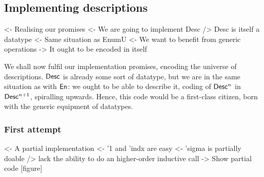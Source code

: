 \subsection{Implementing descriptions}

\begin{wstructure}
<- Realising our promises
    <- We are going to implement Desc
    /> Desc is itself a datatype
        <- Same situation as EnumU
            <- We want to benefit from generic operations
        -> It ought to be encoded in itself
\end{wstructure}

We shall now fulfil our implementation promises, encoding the universe
of descriptions. $\Desc$ is already some sort of datatype, but we are
in the same situation as with $\EnumU$: we ought to be able to
describe it, coding of $\Desc^n$ in $\Desc^{n+1}$, spiralling
upwards. Hence, this code would be a first-class citizen, born with
the generic equipment of datatypes.

\subsubsection{First attempt}

\begin{wstructure}
<- A partial implementation
    <- '1 and 'indx are easy
    <- 'sigma is partially doable
        /> lack the ability to do an higher-order inductive call
    -> Show partial code [figure]
\end{wstructure}

